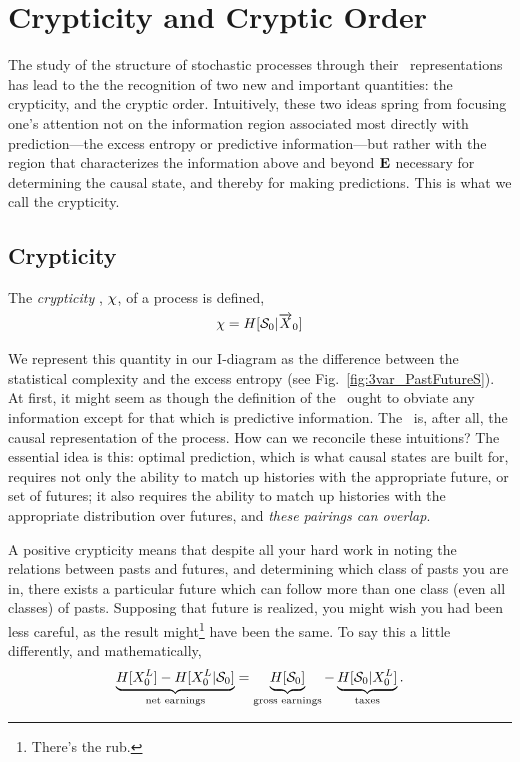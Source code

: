 \section{Crypticity and Cryptic Order}
The study of the structure of stochastic processes through their \eM\ representations has lead to the the recognition of two new and important quantities: the crypticity, and the cryptic order. Intuitively, these two ideas spring from focusing one's attention not on the information region associated most directly with prediction---the excess entropy or predictive information---but rather with the region that characterizes the information above and beyond ${\bf E}$ necessary for determining the causal state, and thereby for making predictions. This is what we call the crypticity.

\subsection{Crypticity}
\begin{Def}
The \emph{crypticity} , $\chi$, of a process is defined,
\begin{align*}
\chi = H[\mathcal{S}_0 | \smash{\overrightarrow{{X}}}_0]
\end{align*}
\end{Def}

We represent this quantity in our I-diagram as the difference between the statistical complexity and the excess entropy (see Fig.~\ref{fig:3var_PastFutureS}). At first, it might seem as though the definition of the \eM\ ought to obviate any information except for that which is predictive information. The \eM\ is, after all, the causal representation of the process. How can we reconcile these intuitions? The essential idea is this: optimal prediction, which is what causal states are built for, requires not only the ability to match up histories with the appropriate future, or set of futures; it also requires the ability to match up histories with the appropriate distribution over futures, and \emph{these pairings can overlap}.

A positive crypticity means that despite all your hard work in noting the relations between pasts and futures, and determining which class of pasts you are in, there exists a particular future which can follow more than one class (even all classes) of pasts. Supposing that future is realized, you might wish you had been less careful, as the result might\footnote{There's the rub.} have been the same. To say this a little differently, and mathematically,
\begin{align*}
\underbrace{H[{X}_0^L] - H[{X}_0^L | \mathcal{S}_0]}_{\text{net earnings}} = \underbrace{H[\mathcal{S}_0]}_{\text{gross earnings}} - \underbrace{H[\mathcal{S}_0 | {X}_0^L]}_{\text{taxes}}.
\end{align*}

